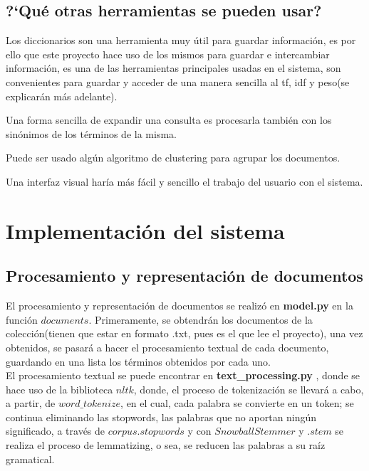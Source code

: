 \documentclass{llncs}
\begin{document}
\subsection{?`Qu\'e otras herramientas se pueden usar?}

\begin{list}{-}{•}
\item Los diccionarios son una herramienta muy \'util para guardar informaci\'on, es por ello que este proyecto hace uso de los mismos para guardar e intercambiar informaci\'on, es una de las herramientas principales usadas en el sistema, son convenientes para guardar y acceder de una manera sencilla al tf, idf y peso(se explicar\'an m\'as adelante).\\

\item Una forma sencilla de expandir una consulta es procesarla tambi\'en con los sin\'onimos de los t\'erminos de la misma.\\

\item Puede ser usado alg\'un algoritmo de clustering para agrupar los documentos.\\

\item Una interfaz visual har\'ia m\'as f\'acil y sencillo el trabajo del usuario con el sistema.\\
\end{list}

%
\section{Implementaci\'on del sistema}
%

\subsection{Procesamiento y representaci\'on de documentos}
El procesamiento y representaci\'on de documentos se realiz\'o en \textbf{model.py} en la funci\'on $documents$. Primeramente, se obtendr\'an los documentos de la colecci\'on(tienen que estar en formato .txt, pues es el que lee el proyecto), una vez obtenidos, se pasar\'a a hacer el procesamiento textual de cada documento, guardando en una lista los t\'erminos obtenidos por cada uno.\\

El procesamiento textual se puede encontrar en \textbf{text\_processing.py} , donde se hace uso de la biblioteca $nltk$, donde, el proceso de tokenizaci\'on se llevar\'a a cabo, a partir, de $word\_tokenize$, en el cual, cada palabra se convierte en un token; se continua eliminando las stopwords, las palabras que no aportan ning\'un significado, a trav\'es de $corpus.stopwords$ y con $SnowballStemmer$ y $.stem$ se realiza el proceso de lemmatizing, o sea, se reducen las palabras a su ra\'iz gramatical.\\
\end{document}
